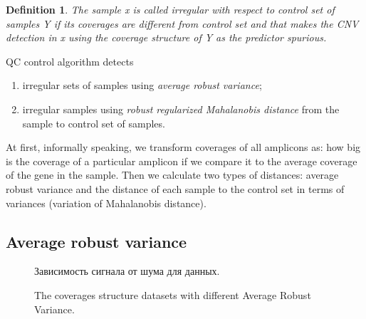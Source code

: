 \documentclass{article}
\newtheorem{mydef}{Definition}
\begin{document}
\begin{mydef}
 The sample x is called irregular with respect to control set of samples Y if its coverages are different from control set and that makes the CNV detection in x using the coverage structure of Y as the predictor spurious.  
\end{mydef}

QC control algorithm detects

\begin{enumerate}
\item irregular sets of samples using {\it average robust variance};
\item irregular samples using {\it robust regularized Mahalanobis distance} from the sample to control set of samples.
\end{enumerate}

At first, informally speaking, we transform coverages of all amplicons as: how big is the coverage of a particular amplicon if we compare it to the average coverage of the gene in the sample. Then we calculate two types of distances: average robust variance and the distance of each sample to the control set in terms of variances (variation of Mahalanobis distance).







\newpage
\subsection{Average robust variance}

\begin{figure}[h!]
\begin{minipage}[h]{0.4\linewidth}
\end{minipage}
\hfill
\begin{minipage}[h]{0.4\linewidth}
\end{minipage}
\caption{Зависимость сигнала от шума для данных.}
\begin{minipage}[h]{0.4\linewidth}
\end{minipage}
\hfill
\begin{minipage}[h]{0.4\linewidth}
\end{minipage}
\caption{The coverages structure datasets with different Average Robust Variance.}
\label{ris:image1}
\end{figure}
\end{document}
